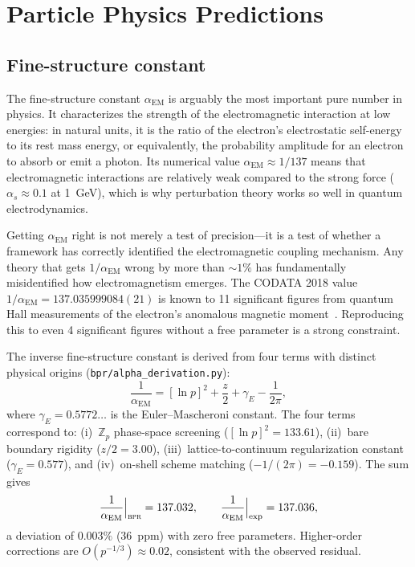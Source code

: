 \documentclass[aps,prd,twocolumn,superscriptaddress,longbibliography,nofootinbib]{revtex4-2}
\newcommand{\Zp}{\mathbb{Z}_p}
\newcommand{\alphaEM}{\alpha_{\mathrm{EM}}}
\newcommand{\bpr}{\textsc{bpr}}
\begin{document}
\section{Particle Physics Predictions}
\label{sec:particle}

\subsection{Fine-structure constant}

The fine-structure constant $\alphaEM$ is arguably the most
important pure number in physics.  It characterizes the strength of
the electromagnetic interaction at low energies: in natural units,
it is the ratio of the electron's electrostatic self-energy to its
rest mass energy, or equivalently, the probability amplitude for an
electron to absorb or emit a photon.  Its numerical value
$\alphaEM \approx 1/137$ means that electromagnetic interactions are
relatively weak compared to the strong force ($\alpha_s \approx 0.1$
at 1~GeV), which is why perturbation theory works so well in quantum
electrodynamics.

Getting $\alphaEM$ right is not merely a test of precision---it is
a test of whether a framework has correctly identified the
electromagnetic coupling mechanism.  Any theory that gets
$1/\alphaEM$ wrong by more than $\sim 1\%$ has fundamentally
misidentified how electromagnetism emerges.  The CODATA 2018 value
$1/\alphaEM = 137.035999084(21)$ is known to 11 significant
figures from quantum Hall measurements of the electron's anomalous
magnetic moment~\cite{PDG2024}.  Reproducing this to even 4
significant figures without a free parameter is a strong
constraint.

The inverse fine-structure constant is derived from four terms with
distinct physical origins (\texttt{bpr/alpha\_derivation.py}):
\begin{equation}
\frac{1}{\alphaEM} = [\ln p]^2 + \frac{z}{2} + \gamma_E
  - \frac{1}{2\pi},
\label{eq:alpha}
\end{equation}
where $\gamma_E = 0.5772\ldots$ is the Euler--Mascheroni constant.
The four terms correspond to: (i)~$\Zp$ phase-space screening
($[\ln p]^2 = 133.61$), (ii)~bare boundary rigidity ($z/2 = 3.00$),
(iii)~lattice-to-continuum regularization constant ($\gamma_E =
0.577$), and (iv)~on-shell scheme matching ($-1/(2\pi) = -0.159$).
The sum gives
\begin{equation}
\frac{1}{\alphaEM}\Big|_{\bpr} = 137.032, \qquad
\frac{1}{\alphaEM}\Big|_{\mathrm{exp}} = 137.036,
\label{eq:alpha_value}
\end{equation}
a deviation of $0.003\%$ (36~ppm) with zero free parameters.
Higher-order corrections are $O(p^{-1/3}) \approx 0.02$, consistent
with the observed residual.
\end{document}
